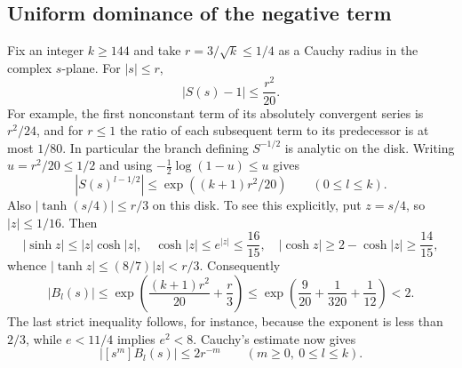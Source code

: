 \documentclass[11pt,a4paper]{article}
\theoremstyle{definition}
\theoremstyle{remark}
\numberwithin{equation}{section}
\begin{document}
\subsection{Uniform dominance of the negative term}

Fix an integer $k\geq144$ and take $r=3/\sqrt k\leq1/4$ as a Cauchy
radius in the complex $s$-plane. For $|s|\leq r$,
\begin{equation}\label{p1:eq:S-bound}
 |S(s)-1|\leq\frac{r^2}{20}.
\end{equation}
For example, the first nonconstant term of its absolutely convergent
series is $r^2/24$, and for $r\leq1$ the ratio of each subsequent
term to its predecessor is at most $1/80$.
In particular the branch defining $S^{-1/2}$ is analytic on the disk.
Writing $u=r^2/20\leq1/2$ and using
$-\tfrac12\log(1-u)\leq u$ gives
\[
 |S(s)^{l-1/2}|\leq\exp((k+1)r^2/20)
       \qquad(0\leq l\leq k).
\]
Also $|\tanh(s/4)|\leq r/3$ on this disk. To see this explicitly,
put $z=s/4$, so $|z|\leq1/16$. Then
\[
 |\sinh z|\leq |z|\cosh|z|,\quad
 \cosh|z|\leq e^{|z|}\leq\frac{16}{15},\quad
 |\cosh z|\geq2-\cosh|z|\geq\frac{14}{15},
\]
whence $|\tanh z|\leq(8/7)|z|<r/3$.
Consequently
\[
 |B_l(s)|
 \leq\exp\left(\frac{(k+1)r^2}{20}+\frac r3\right)
 \leq\exp\left(\frac9{20}+\frac1{320}+\frac1{12}\right)<2.
\]
The last strict inequality follows, for instance, because the
exponent is less than $2/3$, while $e<11/4$ implies $e^2<8$.
Cauchy's estimate now gives
\begin{equation}\label{p1:eq:B-Cauchy}
 |[s^m]B_l(s)|\leq2r^{-m}\qquad(m\geq0,\ 0\leq l\leq k).
\end{equation}
\end{document}
